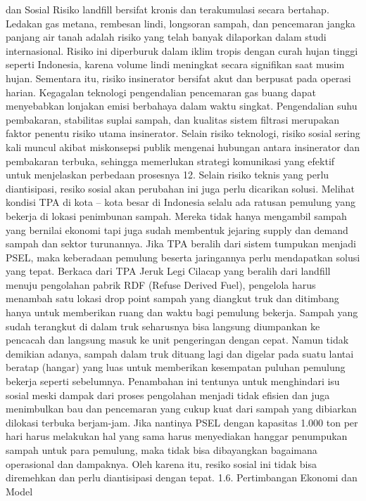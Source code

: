 \documentclass[
  letterpaper,
  DIV=11,
  numbers=noendperiod]{scrreprt}
\begin{document}
dan Sosial Risiko landfill bersifat kronis dan terakumulasi secara
bertahap. Ledakan gas metana, rembesan lindi, longsoran sampah, dan
pencemaran jangka panjang air tanah adalah risiko yang telah banyak
dilaporkan dalam studi internasional. Risiko ini diperburuk dalam iklim
tropis dengan curah hujan tinggi seperti Indonesia, karena volume lindi
meningkat secara signifikan saat musim hujan. Sementara itu, risiko
insinerator bersifat akut dan berpusat pada operasi harian. Kegagalan
teknologi pengendalian pencemaran gas buang dapat menyebabkan lonjakan
emisi berbahaya dalam waktu singkat. Pengendalian suhu pembakaran,
stabilitas suplai sampah, dan kualitas sistem filtrasi merupakan faktor
penentu risiko utama insinerator. Selain risiko teknologi, risiko sosial
sering kali muncul akibat miskonsepsi publik mengenai hubungan antara
insinerator dan pembakaran terbuka, sehingga memerlukan strategi
komunikasi yang efektif untuk menjelaskan perbedaan prosesnya 12. Selain
risiko teknis yang perlu diantisipasi, resiko sosial akan perubahan ini
juga perlu dicarikan solusi. Melihat kondisi TPA di kota -- kota besar
di Indonesia selalu ada ratusan pemulung yang bekerja di lokasi
penimbunan sampah. Mereka tidak hanya mengambil sampah yang bernilai
ekonomi tapi juga sudah membentuk jejaring supply dan demand sampah dan
sektor turunannya. Jika TPA beralih dari sistem tumpukan menjadi PSEL,
maka keberadaan pemulung beserta jaringannya perlu mendapatkan solusi
yang tepat. Berkaca dari TPA Jeruk Legi Cilacap yang beralih dari
landfill menuju pengolahan pabrik RDF (Refuse Derived Fuel), pengelola
harus menambah satu lokasi drop point sampah yang diangkut truk dan
ditimbang hanya untuk memberikan ruang dan waktu bagi pemulung bekerja.
Sampah yang sudah terangkut di dalam truk seharusnya bisa langsung
diumpankan ke pencacah dan langsung masuk ke unit pengeringan dengan
cepat. Namun tidak demikian adanya, sampah dalam truk dituang lagi dan
digelar pada suatu lantai beratap (hangar) yang luas untuk memberikan
kesempatan puluhan pemulung bekerja seperti sebelumnya. Penambahan ini
tentunya untuk menghindari isu sosial meski dampak dari proses
pengolahan menjadi tidak efisien dan juga menimbulkan bau dan pencemaran
yang cukup kuat dari sampah yang dibiarkan dilokasi terbuka berjam-jam.
Jika nantinya PSEL dengan kapasitas 1.000 ton per hari harus melakukan
hal yang sama harus menyediakan hanggar penumpukan sampah untuk para
pemulung, maka tidak bisa dibayangkan bagaimana operasional dan
dampaknya. Oleh karena itu, resiko sosial ini tidak bisa diremehkan dan
perlu diantisipasi dengan tepat. 1.6. Pertimbangan Ekonomi dan Model
\end{document}
